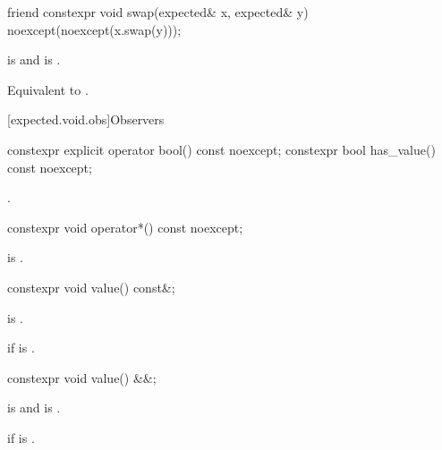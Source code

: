 %
\begin{itemdecl}
friend constexpr void swap(expected& x, expected& y) noexcept(noexcept(x.swap(y)));
\end{itemdecl}

\begin{itemdescr}
\pnum
\constraints
{} is  and  is .

\pnum
\effects
Equivalent to .
\end{itemdescr}

[expected.void.obs]{Observers}

%
%
\begin{itemdecl}
constexpr explicit operator bool() const noexcept;
constexpr bool has_value() const noexcept;
\end{itemdecl}

\begin{itemdescr}
\pnum
\returns
{}.
\end{itemdescr}

%
\begin{itemdecl}
constexpr void operator*() const noexcept;
\end{itemdecl}

\begin{itemdescr}
\pnum
\hardexpects
{} is .
\end{itemdescr}

%
\begin{itemdecl}
constexpr void value() const&;
\end{itemdecl}

\begin{itemdescr}
\pnum
\mandates
{} is .

\pnum
\throws
{} if  is .
\end{itemdescr}

%
\begin{itemdecl}
constexpr void value() &&;
\end{itemdecl}

\begin{itemdescr}
\pnum
\mandates
{} is  and  is .

\pnum
\throws
{} if  is .
\end{itemdescr}


